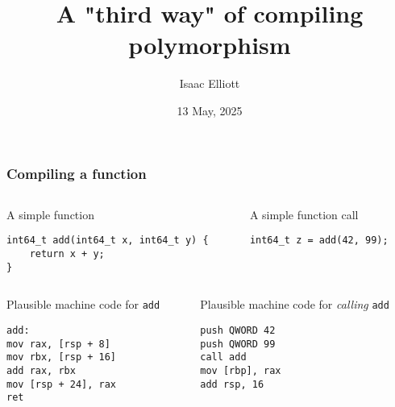 \documentclass[t]{beamer}
\title{A "third way" of compiling polymorphism}
\author{Isaac Elliott}
\date{13 May, 2025}
\begin{document}
\frame{\titlepage}


\begin{frame}[fragile]
\frametitle{Compiling a function}

\begin{columns}
\begin{column}{0.48\textwidth}
\begin{block}{A simple function}
\footnotesize
\begin{verbatim}
int64_t add(int64_t x, int64_t y) {
    return x + y;
}
\end{verbatim}
\end{block}
\end{column}

\begin{column}{0.48\textwidth}
\begin{block}{A simple function call}
\begin{verbatim}
int64_t z = add(42, 99);
\end{verbatim}
\end{block}
\end{column}
\end{columns}

\begin{columns}

\pause

\begin{column}{0.48\textwidth}
\begin{block}{Plausible machine code for \texttt{add}}
\begin{verbatim}
add:
mov rax, [rsp + 8]
mov rbx, [rsp + 16]
add rax, rbx
mov [rsp + 24], rax
ret
\end{verbatim}
\end{block}
\end{column}

\begin{column}{0.48\textwidth}
\begin{block}{Plausible machine code for \textit{calling} \texttt{add}}
\begin{verbatim}
push QWORD 42
push QWORD 99
call add
mov [rbp], rax
add rsp, 16
\end{verbatim}
\end{block}
\end{column}
\end{columns}

\end{frame}
\end{document}

